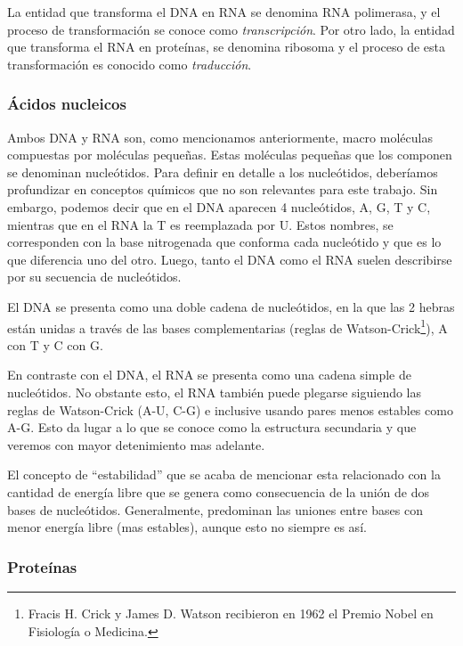 La entidad que transforma el \ac{DNA} en \ac{RNA} se denomina \ac{RNA}
polimerasa, y el proceso de transformaci\'on se conoce como
\textit{transcripci\'on}. Por otro lado, la entidad que transforma el
\ac{RNA} en prote\'inas, se denomina ribosoma y el proceso de esta
transformaci\'on es conocido como \textit{traducci\'on}.

\subsubsection{\'Acidos nucleicos}

Ambos \ac{DNA} y \ac{RNA} son, como mencionamos anteriormente, macro mol\'eculas
compuestas por mol\'eculas peque\~nas. Estas mol\'eculas peque\~nas que los
componen se denominan nucle\'otidos. Para definir en detalle a los
nucle\'otidos, deber\'iamos profundizar en conceptos qu\'imicos que no son
relevantes para este trabajo. Sin embargo, podemos decir que en el \ac{DNA}
aparecen 4 nucle\'otidos, \ac{A}, \ac{G}, \ac{T} y \ac{C}, mientras que en el
\ac{RNA} la \ac{T} es reemplazada por \ac{U}. Estos nombres, se corresponden
con la base nitrogenada que conforma cada nucle\'otido y que es lo que
diferencia uno del otro. Luego, tanto el \ac{DNA} como el \ac{RNA} suelen
describirse por su secuencia de nucle\'otidos.

El \ac{DNA} se presenta como una doble cadena de nucle\'otidos, en la que las 2
hebras est\'an unidas a trav\'es de las bases complementarias (reglas de
Watson-Crick\footnote{Fracis H. Crick y James D. Watson recibieron en 1962 el
Premio Nobel en Fisiolog\'ia o Medicina.}), \ac{A} con \ac{T} y \ac{C} con
\ac{G}.

En contraste con el \ac{DNA}, el \ac{RNA} se presenta como una cadena simple de
nucle\'otidos. No obstante esto, el \ac{RNA} tambi\'en puede plegarse siguiendo
las reglas de Watson-Crick (\ac{A}-\ac{U}, \ac{C}-\ac{G}) e inclusive usando
pares menos estables como \ac{A}-\ac{G}. Esto da lugar a lo que se conoce
como la estructura secundaria y que veremos con mayor detenimiento mas adelante.

El concepto de ``estabilidad'' que se acaba de mencionar esta relacionado con
la cantidad de energ\'ia libre que se genera como consecuencia de la uni\'on de
dos bases de nucle\'otidos. Generalmente, predominan las uniones entre bases con
menor energ\'ia libre (mas estables), aunque esto no siempre es as\'i.

\subsubsection{Prote\'inas}

